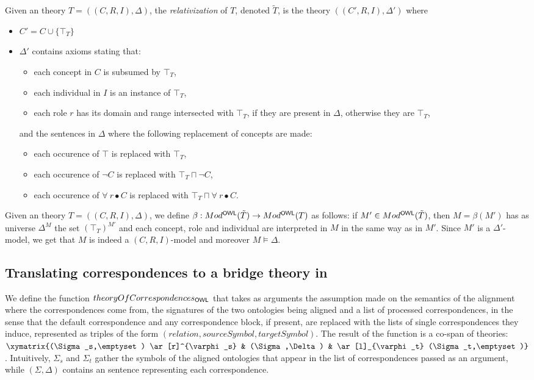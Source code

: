 \documentclass[10pt,fleqn,final]{scrreprt}
\newcommand{\ssclause}[1]{\subsection{#1}}
\newenvironment{definitions}[0]{\medskip }{}
\begin{document}
\begin{definitions}
\begin{definition}
Given an \OWL theory $T = ((C,R,I), \Delta)$,
the \emph{relativization} of $T$, denoted $\tilde{T}$, is the theory 
$((C',R,I),\Delta')$ where
\begin{itemize}
\item $C' = C\cup\{\top_T\}$
\item $\Delta'$ contains axioms stating that:
  \begin{itemize}
    \item each concept in $C$ is subsumed by $\top_T$,
    \item each individual in $I$ is an instance of $\top_T$,
    \item each role $r$ has its domain and range intersected with $\top_T$, if they
    are present in $\Delta$, otherwise they are $\top_T$,
  \end{itemize}
  \noindent and the sentences in $\Delta$ where the following replacement of concepts
  are made:
  \begin{itemize}
   \item each occurence of $\top$ is replaced with $\top_T$,
   \item each occurence of $\neg C$ is replaced with $\top_T \sqcap \neg C$,
   \item each occurence of $\forall~r\bullet C$ is replaced with 
   $\top_T \sqcap \forall~r\bullet C$.
  \end{itemize}
\end{itemize}
\end{definition}

\begin{definition}
Given an \OWL theory $T = ((C,R,I), \Delta)$,
we define $\beta: Mod^\mathsf{OWL}(\tilde{T}) \to Mod^\mathsf{OWL}(T)$ as follows: 
if $M'\in Mod^\mathsf{OWL}(\tilde{T})$, then $M=\beta(M')$ has as universe
$\Delta^M$ the set $(\top_T)^{M'}$ and each concept, role and individual are
interpreted in $M$ in the same way as in $M'$. Since $M'$ is a $\Delta'$-model,
we get that $M$ is indeed a $(C,R,I)$-model and moreover $M\models \Delta$.
\end{definition}

\ssclause{Translating correspondences to a bridge theory in \OWL}

We define the function $theoryOfCorrespondences_\mathsf{OWL}$ that takes as arguments
the assumption made on the semantics of the alignment where the
correspondences come from, the signatures of the two ontologies being aligned
and a list of processed correspondences, in the sense 
that the default correspondence and any correspondence block, if present, 
are replaced with the lists of single correspondences they induce,
represented as triples of the form $(relation, sourceSymbol, targetSymbol)$.
The result of the function is a co-span of theories:
$\xymatrix{(\Sigma_s,\emptyset) \ar[r]^{\varphi_s} & (\Sigma,\Delta) & \ar[l]_{\varphi_t} (\Sigma_t,\emptyset)}$. Intuitively, $\Sigma_s$ and $\Sigma_t$ gather the symbols
of the aligned ontologies that appear in the list of correspondences passed as an
argument, while $(\Sigma,\Delta)$ contains an \OWL sentence 
representing each correspondence.


\end{definitions}
\end{document}
